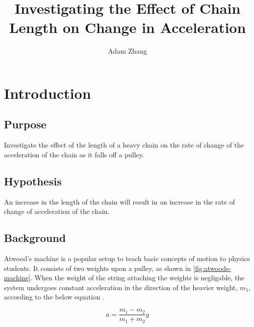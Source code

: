 \documentclass[stu,biblatex,floatsintext,draftall]{apa7}
\title{Investigating the Effect of Chain Length on Change in Acceleration}
\author{Adam Zhang}
\affiliation{Academies of Loudoun}
\begin{document}
\maketitle
\tableofcontents
\newpage

\section{Introduction}

\subsection{Purpose}
Investigate the effect of the length of a heavy chain on the rate of change of the acceleration of the chain as it falls off a pulley.

\subsection{Hypothesis}\label{sec:hypothesis}
An increase in the length of the chain will result in an increase in the rate of change of acceleration of the chain.

\subsection{Background}
Atwood's machine is a popular setup to teach basic concepts of motion to physics students. It consists of two weights upon a pulley, as shown in \autoref{fig:atwoods-machine}. When the weight of the string attaching the weights is negligable, the system undergoes constant acceleration in the direction of the heavier weight, $m_1$, according to the below equation \parencite{Zeleny2011AtwoodsMachine}.

\begin{displaymath}
	a = \frac{m_1 - m_2}{m_1 + m_2}g
\end{displaymath}
\end{document}
